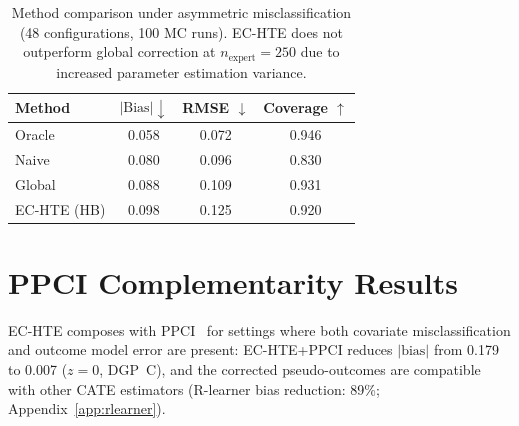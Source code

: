 \begin{table}[h]
\centering
\caption{Method comparison under asymmetric misclassification (48 configurations, 100 MC runs). EC-HTE does not outperform global correction at $n_{\text{expert}}{=}250$ due to increased parameter estimation variance.}
\label{tab:asym_method_grid}
\small
\begin{tabular}{l ccc}
\toprule
Method & $|\text{Bias}| \downarrow$ & RMSE $\downarrow$ & Coverage $\uparrow$ \\
\midrule
Oracle & 0.058 & 0.072 & 0.946 \\
Naive & 0.080 & 0.096 & 0.830 \\
Global & 0.088 & 0.109 & 0.931 \\
EC-HTE (HB) & 0.098 & 0.125 & 0.920 \\
\bottomrule
\end{tabular}
\end{table}

\section{PPCI Complementarity Results}
\label{app:ppci}
\label{sec:ppci}

EC-HTE composes with PPCI~\cite{sui2026ppci} for settings where both covariate misclassification and outcome model error are present: EC-HTE+PPCI reduces $|\text{bias}|$ from 0.179 to 0.007 ($z{=}0$, DGP~C), and the corrected pseudo-outcomes are compatible with other CATE estimators (R-learner bias reduction: 89\%; Appendix~\ref{app:rlearner}).

